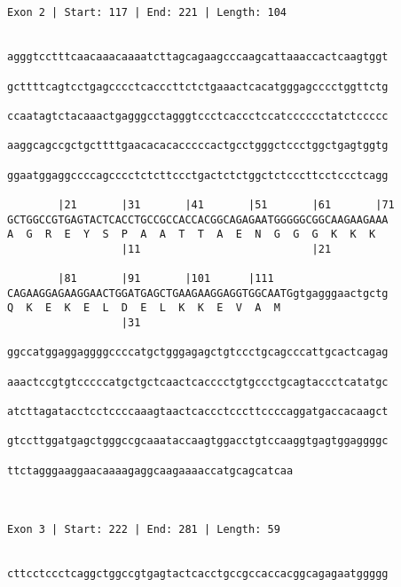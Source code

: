 \documentclass{article}
\begin{document}
\begin{Verbatim}
                                                        
 
Exon 2 | Start: 117 | End: 221 | Length: 104


agggtcctttcaacaaacaaaatcttagcagaagcccaagcattaaaccactcaagtggt
                                                            
gcttttcagtcctgagcccctcacccttctctgaaactcacatgggagcccctggttctg
                                                            
ccaatagtctacaaactgagggcctagggtccctcaccctccatcccccctatctccccc
                                                            
aaggcagccgctgcttttgaacacacacccccactgcctgggctccctggctgagtggtg
                                                            
ggaatggaggccccagcccctctcttccctgactctctggctctcccttcctccctcagg
                                                            
        |21       |31       |41       |51       |61       |71
GCTGGCCGTGAGTACTCACCTGCCGCCACCACGGCAGAGAATGGGGGCGGCAAGAAGAAA
A  G  R  E  Y  S  P  A  A  T  T  A  E  N  G  G  G  K  K  K  
                  |11                           |21         
  
        |81       |91       |101      |111                  
CAGAAGGAGAAGGAACTGGATGAGCTGAAGAAGGAGGTGGCAATGgtgagggaactgctg
Q  K  E  K  E  L  D  E  L  K  K  E  V  A  M                 
                  |31                                       
  
ggccatggaggaggggccccatgctgggagagctgtccctgcagcccattgcactcagag
                                                            
aaactccgtgtcccccatgctgctcaactcacccctgtgccctgcagtaccctcatatgc
                                                            
atcttagatacctcctccccaaagtaactcaccctcccttccccaggatgaccacaagct
                                                            
gtccttggatgagctgggccgcaaataccaagtggacctgtccaaggtgagtggaggggc
                                                            
ttctagggaaggaacaaaagaggcaagaaaaccatgcagcatcaa
                                             
                                             
 
Exon 3 | Start: 222 | End: 281 | Length: 59


cttcctccctcaggctggccgtgagtactcacctgccgccaccacggcagagaatggggg
                                                            

\end{Verbatim}
\end{document}
